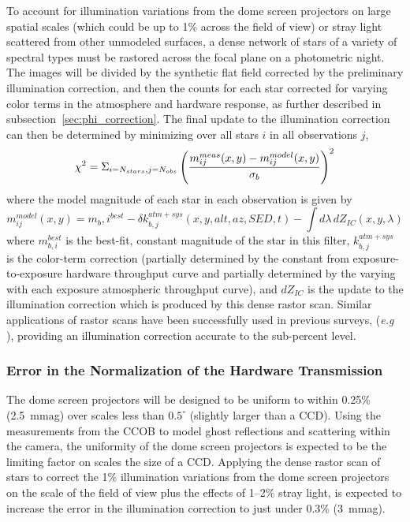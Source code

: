 \documentclass[12pt,preprint]{aastex}
\begin{document}
To account for illumination variations from the dome screen projectors
on large spatial scales (which could be up to 1\% across the field of
view) or stray light scattered from other unmodeled surfaces, a dense
network of stars of a variety of spectral types must be rastored
across the focal plane on a photometric night. The images will be
divided by the synthetic flat field corrected by the preliminary
illumination correction, and then the counts for each star corrected
for varying color terms in the atmosphere and hardware response, as
further described in subsection~\ref{sec:phi_correction}.  The final
update to the illumination correction can then be determined by
minimizing over all stars $i$ in all observations $j$,
\begin{equation}
 \chi^2 =  \Sigma_{i=N_{stars},j=N_{obs}} \left( { m_{ij}^{meas}(x,y) - m_{ij}^{model}(x,y)
\over \sigma_b} \right)^2  
\end{equation}
where the model magnitude of each star in each observation is given by
\begin{equation}
m_{ij}^{model}(x,y) =  m_b,i^{best} - \delta k_{b,j}^{atm+sys}(x,y,alt,az,SED,t) - \int d\lambda \, dZ_{IC}(x,y,\lambda)
\end{equation}
where $m_{b,i}^{best}$ is the best-fit, constant magnitude of the star
in this filter, $k_{b,j}^{atm+sys}$ is the color-term correction
(partially determined by the constant from exposure-to-exposure
hardware throughput curve and partially determined by the varying with
each exposure atmospheric throughput curve), and $dZ_{IC}$ is the
update to the illumination correction which is produced by this dense
rastor scan. Similar applications of rastor scans have been
successfully used in previous surveys, ({\it e.g} \citet{Regnault2009,
Magnier2004, Manfroid1996}), providing an illumination correction
accurate to the sub-percent level.

\subsubsection{Error in the Normalization of the Hardware Transmission}

The dome screen projectors will be designed to be uniform to within
0.25\% (2.5~mmag) over scales less than $0.5^{\circ}$ (slightly larger
than a CCD). Using the measurements from the CCOB to model ghost
reflections and scattering within the camera, the uniformity of the
dome screen projectors is expected to be the limiting factor on scales
the size of a CCD. Applying the dense rastor scan of stars to correct
the 1\% illumination variations from the dome screen projectors on the
scale of the field of view plus the effects of 1--2\% stray light, is
expected to increase the error in the illumination correction to just
under 0.3\% (3~mmag).
\end{document}
